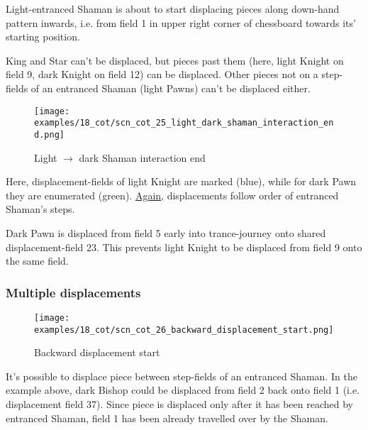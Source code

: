 Light-entranced Shaman is about to start displacing pieces along down-hand pattern inwards,
i.e. from field 1 in upper right corner of chessboard towards its' starting position.

King and Star can't be displaced, but pieces past them (here, light Knight on field 9, dark Knight
on field 12) can be displaced. Other pieces not on a step-fields of an entranced Shaman (light
Pawns) can't be displaced either.

\clearpage %

\noindent
\begin{figure}[!h]
\texttt{[image: examples/18\_cot/scn\_cot\_25\_light\_dark\_shaman\_interaction\_end.png]}
\caption{Light $\rightarrow$ dark Shaman interaction end}
\label{fig:scn_cot_25_light_dark_shaman_interaction_end}
\end{figure}

Here, displacement-fields of light Knight are marked (blue), while for dark Pawn they are
enumerated (green). \hyperref[fig:scn_cot_17_light_light_shaman_interaction_end]{Again}, displacements follow order of entranced Shaman's steps.

Dark Pawn is displaced from field 5 early into trance-journey onto shared displacement-field
23. This prevents light Knight to be displaced from field 9 onto the same field.

\clearpage %

\subsubsection*{Multiple displacements}

\noindent
\begin{figure}[!h]
\vspace{-1.0\baselineskip}
\texttt{[image: examples/18\_cot/scn\_cot\_26\_backward\_displacement\_start.png]}
\caption{Backward displacement start}
\label{fig:scn_cot_26_backward_displacement_start}
\end{figure}

It's possible to displace piece between step-fields of an entranced Shaman. In the example
above, dark Bishop could be displaced from field 2 back onto field 1 (i.e. displacement
field 37). Since piece is displaced only after it has been reached by entranced Shaman,
field 1 has been already travelled over by the Shaman.

